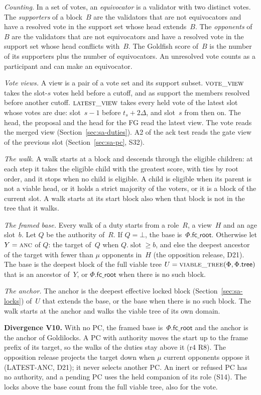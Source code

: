 \documentclass{article}
\newcommand{\slot}{\operatorname{slot}}
\newcommand{\Fr}{\Phi}
\newcommand{\tree}{\mathsf{tree}}
\newcommand{\fcroot}{\mathsf{fc\_root}}
\newcommand{\filtered}{\fname{viable\_tree}}
\newcommand{\fname}[1]{\text{\textsc{#1}}}
\newcommand{\PCdiv}[2]{\par\noindent\textbf{Divergence #1.} #2\par}
\begin{document}
\emph{Counting.}  In a set of votes, an \emph{equivocator} is a validator
with two distinct votes.  The \emph{supporters} of a block~$B$ are the
validators that are not equivocators and have a resolved vote in the
support set whose head extends~$B$.  The \emph{opponents} of~$B$ are the
validators that are not equivocators and have a resolved vote in the
support set whose head conflicts with~$B$.  The Goldfish score of~$B$ is
the number of its supporters plus the number of equivocators.  An
unresolved vote counts as a participant and can make an equivocator.

\emph{Vote views.}  A view is a pair of a vote set and its support subset.
$\Call{vote\_view}{}$ takes the slot-$s$ votes held before a cutoff, and as
support the members resolved before another cutoff.
$\Call{latest\_view}{}$ takes every held vote of the latest slot whose
votes are due: slot~$s-1$ before $t_s+2\Delta$, and slot~$s$ from then
on.  The head, the proposal and the head for the FG read the latest view.
The vote reads the merged view (Section~\ref{sec:sa-duties}).  A2 of the
ack test reads the gate view of the previous slot (Section~\ref{sec:sa-pc},
S32).

\emph{The walk.}  A walk starts at a block and descends through the
eligible children: at each step it takes the eligible child with the
greatest score, with ties by root order, and it stops when no child is
eligible.  A child is eligible when its parent is not a viable head, or it
holds a strict majority of the voters, or it is a block of the current
slot.  A walk starts at its start block also when that block is not in the
tree that it walks.

\emph{The framed base.}  Every walk of a duty starts from a role~$R$, a
view~$H$ and an age slot~$b$.  Let $Q$ be the authority of~$R$.  If
$Q=\bot$, the base is~$\Fr.\fcroot$.  Otherwise let $Y=\Call{anc}{}$ of $Q$:
the target of~$Q$ when $Q.\slot\geq b$, and else the deepest ancestor of
the target with fewer than $\mu$ opponents in~$H$ (the opposition release,
D21).  The base is the deepest block of the full viable tree
$U=\filtered(\Fr,\Fr.\tree)$ that is an ancestor of~$Y$, or
$\Fr.\fcroot$ when there is no such block.

\emph{The anchor.}  The anchor is the deepest effective locked block
(Section~\ref{sec:sa-locks}) of~$U$ that extends the base, or the base when
there is no such block.  The walk starts at the anchor and walks the viable
tree of its own domain.

\PCdiv{V10}{With no PC, the framed base is~$\Fr.\fcroot$ and the anchor
is the anchor of Goldilocks.  A PC with authority moves the start up to
the frame prefix of its target, so the walks of the duties stay above it
(r4 R8).  The opposition release projects the target down when $\mu$
current opponents oppose it (LATEST-ANC, D21); it never selects another
PC.  An inert or refused PC has no authority, and a pending PC uses the
held companion of its role (S14).  The locks above the base count from the
full viable tree, also for the vote.}
\end{document}
